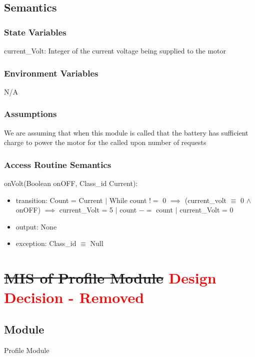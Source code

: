 \documentclass[12pt, titlepage]{article}
\begin{document}
\subsection{Semantics}

\subsubsection{State Variables}

current\_Volt: Integer of the current voltage being supplied to the motor

\subsubsection{Environment Variables}

N/A

\subsubsection{Assumptions}

We are assuming that when this module is called that the battery has sufficient charge to power the motor for the called upon number of requests

\subsubsection{Access Routine Semantics}

\noindent onVolt(Boolean onOFF, Class\_id Current):
\begin{itemize}
\item transition: Count = Current $\vert$ While count $!=$ 0 $\implies$ (current\_volt $\equiv$ 0 $\land$ onOFF) $\implies$ current\_Volt = 5 $\vert$ count $-=$ count $\vert$ current\_Volt = 0  
\item output: None
\item exception: Class\_id $\equiv$ Null 
\end{itemize}

\newpage


\section{\sout{MIS of Profile Module} \textcolor{red}{Design Decision - Removed}} \label{profile Module}
\subsection{Module}
Profile Module
\end{document}
